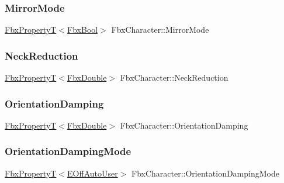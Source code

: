 \mbox{\label{class_fbx_character_a68d6080dfb8f35af92d28760d40dccdf}} 
\subsubsection{\texorpdfstring{Mirror\+Mode}{MirrorMode}}
{\footnotesize\ttfamily \hyperlink{class_fbx_property_t}{Fbx\+PropertyT}$<$\hyperlink{fbxtypes_8h_a92e0562b2fe33e76a242f498b362262e}{Fbx\+Bool}$>$ Fbx\+Character\+::\+Mirror\+Mode}

\mbox{\label{class_fbx_character_ab058db9f793bd106a1756ce4ec794bc9}} 
\subsubsection{\texorpdfstring{Neck\+Reduction}{NeckReduction}}
{\footnotesize\ttfamily \hyperlink{class_fbx_property_t}{Fbx\+PropertyT}$<$\hyperlink{fbxtypes_8h_a171e72a1c46fc15c1a6c9c31948c1c5b}{Fbx\+Double}$>$ Fbx\+Character\+::\+Neck\+Reduction}

\mbox{\label{class_fbx_character_a2be5002d31cb53a01155bf2d1306165d}} 
\subsubsection{\texorpdfstring{Orientation\+Damping}{OrientationDamping}}
{\footnotesize\ttfamily \hyperlink{class_fbx_property_t}{Fbx\+PropertyT}$<$\hyperlink{fbxtypes_8h_a171e72a1c46fc15c1a6c9c31948c1c5b}{Fbx\+Double}$>$ Fbx\+Character\+::\+Orientation\+Damping}

\mbox{\label{class_fbx_character_a6de028b57c5ab1cd224306c2ee65d825}} 
\subsubsection{\texorpdfstring{Orientation\+Damping\+Mode}{OrientationDampingMode}}
{\footnotesize\ttfamily \hyperlink{class_fbx_property_t}{Fbx\+PropertyT}$<$\hyperlink{class_fbx_character_ab698a180e6f900ba8317257749c2ecce}{E\+Off\+Auto\+User}$>$ Fbx\+Character\+::\+Orientation\+Damping\+Mode}

